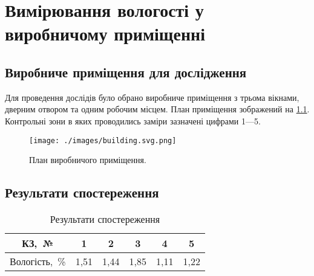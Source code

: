 \chapter{Вимірювання вологості у виробничому приміщенні}

\section{Виробниче приміщення для дослідження}

Для проведення дослідів було обрано виробниче приміщення з трьома вікнами, дверним отвором та одним
робочим місцем. План приміщення зображений на \ref{fig:building}. Контрольні зони в яких проводились
заміри зазначені цифрами 1---5.

\begin{figure}[h] \centering
  \texttt{[image: ./images/building.svg.png]}
  \caption{План виробничого приміщення.}
  \label{fig:building}
\end{figure}

\section{Результати спостереження}

\begin{table}[ht]
\caption{Результати спостереження}
\label{t:results}
\begin{tabular}{| c | c | c | c | c | c |}
\hline
\multicolumn{1}{|p{2cm}|}{КЗ,~№} &
\multicolumn{1}{C{2.2cm}|}{1} &
\multicolumn{1}{C{2.2cm}|}{2} &
\multicolumn{1}{C{2.2cm}|}{3} &
\multicolumn{1}{C{2.2cm}|}{4} &
\multicolumn{1}{C{2.2cm}|}{5} \\ \hline 
Вологість,~\% & 1,51 & 1,44 & 1,85 & 1,11 & 1,22 \\ \hline 
\end{tabular}
\end{table} 


